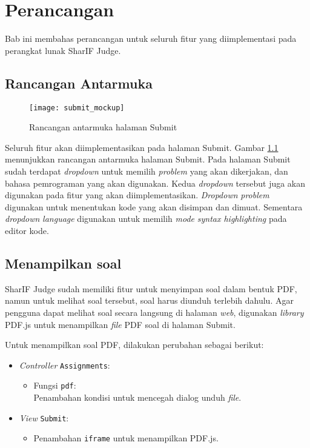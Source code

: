 \chapter{Perancangan}
\label{chap:perancangan}

Bab ini membahas perancangan untuk seluruh fitur yang diimplementasi pada  perangkat lunak SharIF Judge.

\section{Rancangan Antarmuka}
\label{sec:4:antarmuka}

\begin{figure}[H]
	\centering  
	\texttt{[image: submit\_mockup]}  
	\caption{Rancangan antarmuka halaman Submit} 
	\label{fig:4:antarmuka} 
\end{figure} 

Seluruh fitur akan diimplementasikan pada halaman Submit. Gambar \ref{fig:4:antarmuka} menunjukkan rancangan antarmuka halaman Submit. Pada halaman Submit sudah terdapat \textit{dropdown} untuk memilih \textit{problem} yang akan dikerjakan, dan bahasa pemrograman yang akan digunakan. Kedua \textit{dropdown} tersebut juga akan digunakan pada fitur yang akan diimplementasikan. \textit{Dropdown} \textit{problem} digunakan untuk menentukan kode yang akan disimpan dan dimuat. Sementara \textit{dropdown} \textit{language} digunakan untuk memilih \textit{mode} \textit{syntax highlighting} pada editor kode.

\section{Menampilkan soal}
\label{sec:4:soal}

SharIF Judge sudah memiliki fitur untuk menyimpan soal dalam bentuk PDF, namun untuk melihat soal tersebut, soal harus diunduh terlebih dahulu. Agar pengguna dapat melihat soal secara langsung di halaman \textit{web}, digunakan \textit{library} PDF.js untuk menampilkan \textit{file} PDF soal di halaman Submit.

Untuk menampilkan soal PDF, dilakukan perubahan sebagai berikut:
\begin{itemize}
	\item \textit{Controller} \verb|Assignments|:
    \begin{itemize}
		\item Fungsi \verb|pdf|: \\ Penambahan kondisi untuk mencegah dialog unduh \textit{file}.
    \end{itemize}
    \item \textit{View} \verb|Submit|:
    \begin{itemize}
        \item Penambahan \verb|iframe| untuk menampilkan PDF.js.
    \end{itemize}
\end{itemize}

